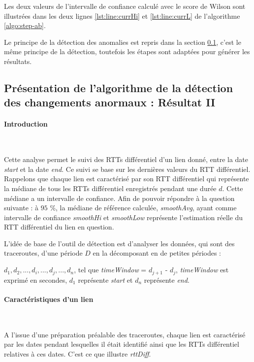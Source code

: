  Les deux valeurs de l'intervalle de confiance calculé avec le score de Wilson sont illustrées dans les deux lignes \ref{lst:line:currHi} et \ref{lst:line:currL} de l'algorithme 	\ref{algo:step-ab}. 
  
  Le principe de la détection des anomalies est repris dans la section \ref{resultII}, c'est le même principe de la détection, toutefois les étapes sont adaptées pour générer les résultats. 
  


\subsection{Présentation de l'algorithme de la détection des changements anormaux : Résultat II} \label{resultII}
  
\paragraph{Introduction} ~
  
  Cette analyse permet le suivi des RTTs différentiel d'un lien donné, entre la date \textit{start} et la date \textit{end}. Ce suivi se base sur les dernières valeurs du RTT différentiel. Rappelons que chaque lien est caractérisé par son RTT différentiel qui représente la médiane de tous les RTTs  différentiel enregistrés pendant une durée $d$. Cette médiane a un intervalle de confiance. Afin de pouvoir répondre à la question suivante : à $95$ \%, la médiane de référence calculée, \textit{smoothAvg},  ayant comme intervalle de confiance  \textit{smoothHi} et \textit{smoothLow} représente l'estimation réelle du RTT différentiel du lien en question. 
  

L'idée de base de l'outil de détection est d'analyser les données, qui sont des traceroutes, d'une période $D$ en la décomposant en de petites périodes :

 $ d_1, d_2, ..., d_i, ..., d_j, ..., d_n$, tel que \textit{timeWindow} = $d_{j+1}$ - $d_{j}$, \textit{timeWindow} est exprimé en secondes, $d_1$ représente \textit{start} et $d_n$ représente \textit{end}.
 
 \paragraph{Caractéristiques d'un lien} ~
 
A l'issue d'une préparation préalable des traceroutes, chaque lien est caractérisé par les dates pendant lesquelles il était identifié ainsi que les RTTs différentiel relatives à ces dates. C'est ce que illustre \textit{rttDiff}.

